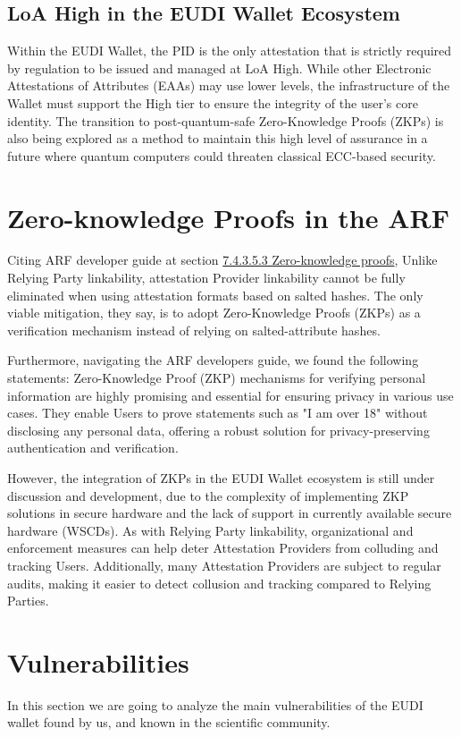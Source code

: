 \documentclass[binding=0.6cm,oneside,noexaminfo]{sapthesis}
\begin{document}
\subsection{LoA High in the EUDI Wallet Ecosystem}
Within the EUDI Wallet, the PID is the only attestation that is strictly required by regulation to be issued and managed at LoA High. While other Electronic Attestations of Attributes (EAAs) may use lower levels, the infrastructure of the Wallet must support the High tier to ensure the integrity of the user's core identity. The transition to post-quantum-safe Zero-Knowledge Proofs (ZKPs) is also being explored as a method to maintain this high level of assurance in a future where quantum computers could threaten classical ECC-based security.

\section{Zero-knowledge Proofs in the ARF}
\label{eudi:zkp}
Citing ARF developer guide at section \href{https://eudi.dev/latest/architecture-and-reference-framework-main/#74353-zero-knowledge-proofs}{7.4.3.5.3 Zero-knowledge proofs},
Unlike Relying Party linkability, attestation Provider linkability cannot be fully eliminated when using attestation formats based on salted hashes. The only viable mitigation, they say,
is to adopt Zero-Knowledge Proofs (ZKPs) as a verification mechanism instead of relying on salted-attribute hashes.

Furthermore, navigating the ARF developers guide, we found the following statements:
Zero-Knowledge Proof (ZKP) mechanisms for verifying personal information are highly promising and essential for ensuring privacy in various use cases. They enable Users to prove 
statements such as "I am over 18" without disclosing any personal data, offering a robust solution for privacy-preserving authentication and verification.

However, the integration of ZKPs in the EUDI Wallet ecosystem is still under discussion and development, due to the complexity of implementing ZKP solutions in secure hardware and the 
lack of support in currently available secure hardware (WSCDs). As with Relying Party linkability, organizational and enforcement measures can help deter Attestation Providers from 
colluding and tracking Users. Additionally, many Attestation Providers are subject to regular audits, making it easier to detect collusion and tracking compared to Relying Parties.

\section{Vulnerabilities}
\label{vulnerabilities}
In this section we are going to analyze the main vulnerabilities of the EUDI wallet found by us, and
known in the scientific community.
\end{document}
